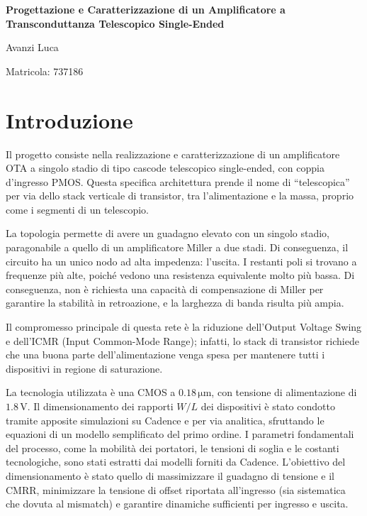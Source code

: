\documentclass[12pt,a4paper,twoside]{report}
\begin{document}
\begin{titlepage}
    \centering
    \null
    \vfill
    
    {\huge \bfseries Progettazione e Caratterizzazione di un Amplificatore a Transconduttanza Telescopico Single-Ended \par}
    
    \vspace{2.5cm}
    
    {\large Avanzi Luca \par}
    \vspace{0.2cm}
    {\large Matricola: 737186 \par}

    \vfill
    \null
\end{titlepage}


\tableofcontents
\clearpage
\chapter{Introduzione}
\label{chap:introduzione}
Il progetto consiste nella realizzazione e caratterizzazione di un amplificatore OTA a singolo stadio di tipo cascode telescopico single-ended, con coppia d'ingresso PMOS. Questa specifica architettura prende il nome di ``telescopica'' per via dello stack verticale di transistor, tra l'alimentazione e la massa, proprio come i segmenti di un telescopio.

La topologia permette di avere un guadagno elevato con un singolo stadio, paragonabile a quello di un amplificatore Miller a due stadi. Di conseguenza, il circuito ha un unico nodo ad alta impedenza: l'uscita. I restanti poli si trovano a frequenze più alte, poiché vedono una resistenza equivalente molto più bassa. Di conseguenza, non è richiesta una capacità di compensazione di Miller per garantire la stabilità in retroazione, e la larghezza di banda risulta più ampia.

Il compromesso principale di questa rete è la riduzione dell'Output Voltage Swing e dell'ICMR (Input Common-Mode Range); infatti, lo stack di transistor richiede che una buona parte dell'alimentazione venga spesa per mantenere tutti i dispositivi in regione di saturazione.

La tecnologia utilizzata è una CMOS a $0.18\,\mathrm{\mu m}$, con tensione di alimentazione di $1.8\,\mathrm{V}$. Il dimensionamento dei rapporti $W/L$ dei dispositivi è stato condotto tramite apposite simulazioni su Cadence e per via analitica, sfruttando le equazioni di un modello semplificato del primo ordine. I parametri fondamentali del processo, come la mobilità dei portatori, le tensioni di soglia e le costanti tecnologiche, sono stati estratti dai modelli forniti da Cadence. L'obiettivo del dimensionamento è stato quello di massimizzare il guadagno di tensione e il CMRR, minimizzare la tensione di offset riportata all'ingresso (sia sistematica che dovuta al mismatch) e garantire dinamiche sufficienti per ingresso e uscita.
\end{document}

